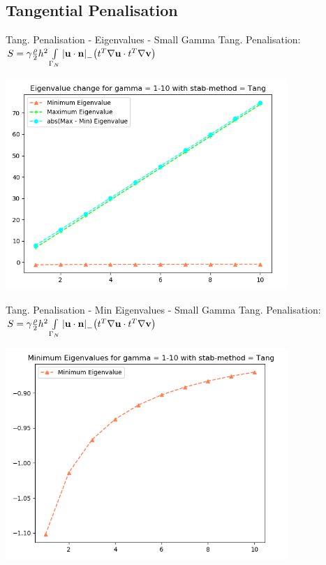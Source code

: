 \subsection{Tangential Penalisation}
\begin{frame}{Tang. Penalisation - Eigenvalues - Small Gamma}
    Tang. Penalisation: \(
      S = \gamma\frac{\rho}{2}h^{2}\int\limits_{\Gamma_{N}} \abs{{\textbf{u}} \cdot {\textbf{n}} }_- \qty(t^{T}\nabla{\textbf{u}} \cdot t^{T}\nabla{\textbf{v}})
      \)
    \begin{center}
        \includegraphics[width=0.8\textwidth]{Media/Gamma_1_thru_10_tang.png}
    \end{center}
\end{frame}

\begin{frame}{Tang. Penalisation - Min Eigenvalues - Small Gamma}
    Tang. Penalisation: \(
      S = \gamma\frac{\rho}{2}h^{2}\int\limits_{\Gamma_{N}} \abs{{\textbf{u}} \cdot {\textbf{n}} }_- \qty(t^{T}\nabla{\textbf{u}} \cdot t^{T}\nabla{\textbf{v}})
      \)
    \begin{center}
        \includegraphics[width=0.8\textwidth]{Media/Gamma_1_thru_10_tang_min.png}
    \end{center}
\end{frame}


